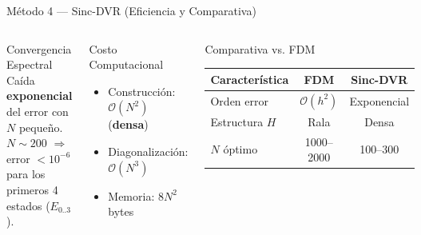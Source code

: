 \documentclass[aspectratio=169,10pt]{beamer}
\begin{document}
\begin{frame}{Método 4 — Sinc-DVR (Eficiencia y Comparativa)}

\begin{columns}[T]

\begin{successbox}{Convergencia Espectral}
Caída \textbf{exponencial} del error con $N$ pequeño.\\
$N \sim 200$ $\Rightarrow$ error $< 10^{-6}$ para los primeros 4 estados ($E_{0..3}$).
\end{successbox}

\vspace{0.4cm}

\begin{alertbox}{Costo Computacional}
\begin{itemize}\setlength\itemsep{4pt}
  \item Construcción: $\mathcal{O}(N^2)$ (\textbf{densa})
  \item Diagonalización: $\mathcal{O}(N^3)$
  \item Memoria: $8N^2$ bytes
\end{itemize}
\end{alertbox}

\vspace{0.6cm}
\begin{block}{Comparativa vs. FDM}
\centering
\small
\begin{tabular}{lcc}
\toprule
\textbf{Característica} & \textbf{FDM} & \textbf{Sinc-DVR} \\
\midrule
Orden error & $\mathcal{O}(h^2)$ & Exponencial\\
Estructura $H$ & Rala & Densa\\
$N$ óptimo & 1000--2000 & 100--300\\
\bottomrule
\end{tabular}
\end{block}

\end{columns}

\end{frame}
\end{document}
